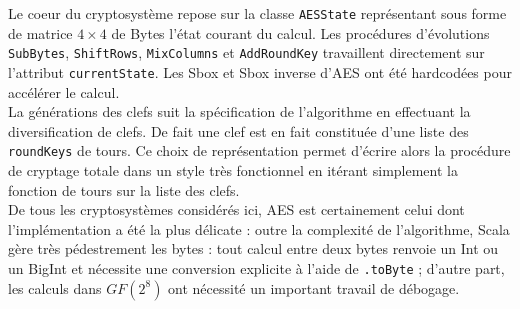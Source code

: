 \documentclass[11pt]{article} %
\begin{document}
Le coeur du cryptosystème repose sur la classe \texttt{AESState} représentant sous forme de matrice $4\times4$ de Bytes l'état courant du calcul. Les procédures d'évolutions \texttt{SubBytes}, \texttt{ShiftRows}, \texttt{MixColumns} et \texttt{AddRoundKey} travaillent directement sur l'attribut \texttt{currentState}. Les Sbox et Sbox inverse d'AES ont été hardcodées pour accélérer le calcul. \\

La générations des clefs suit la spécification de l'algorithme en effectuant la diversification de clefs. De fait une clef est en fait constituée d'une liste des \texttt{roundKeys} de tours.  Ce choix de représentation permet d'écrire alors la procédure de cryptage totale dans un style très fonctionnel en itérant simplement la fonction de tours sur la liste des clefs.\\

De tous les cryptosystèmes considérés ici, AES est certainement celui dont l'implémentation a été la plus délicate : outre la complexité de l'algorithme,  Scala gère très pédestrement les bytes : tout calcul entre deux bytes renvoie un Int ou un BigInt et nécessite une conversion explicite à l'aide de \texttt{.toByte} ; d'autre part, les calculs dans ${GF}(2^8)$ ont nécessité un important travail de débogage.
\end{document}
